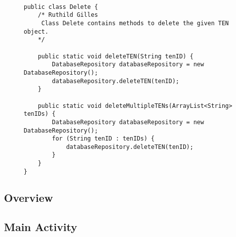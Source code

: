 \begin{figure}[H]
\begin{lstlisting}[caption=Delete Klasse (Ruthild Gilles)]

public class Delete {
    /* Ruthild Gilles
     Class Delete contains methods to delete the given TEN object.
    */

    public static void deleteTEN(String tenID) {
        DatabaseRepository databaseRepository = new DatabaseRepository();
        databaseRepository.deleteTEN(tenID);
    }

    public static void deleteMultipleTENs(ArrayList<String> tenIDs) {
        DatabaseRepository databaseRepository = new DatabaseRepository();
        for (String tenID : tenIDs) {
            databaseRepository.deleteTEN(tenID);
        }
    }
}
\end{lstlisting}
\end{figure}

\subsection{Overview}



\subsection{Main Activity}